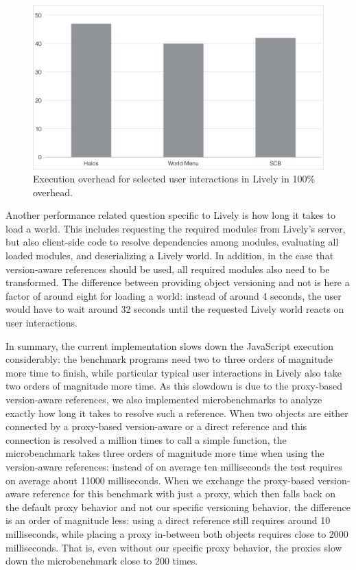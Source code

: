 \begin{figure}[h]
    \centering
    \includegraphics[width=\textwidth]{figures/livelyInteractionsOverhead.pdf}
    \caption{Execution overhead for selected user interactions in Lively in 100\% overhead.}
    \label{fig:LivelyInteractionsOverhead}
\end{figure}

Another performance related question specific to Lively is how long it takes to load a world.
This includes requesting the required modules from Lively's server, but also client-side code to resolve dependencies among modules, evaluating all loaded modules, and deserializing a Lively world.
In addition, in the case that version-aware references should be used, all required modules also need to be transformed.
The difference between providing object versioning and not is here a factor of around eight for loading a world: instead of around 4 seconds, the user would have to wait around 32 seconds until the requested Lively world reacts on user interactions.

In summary, the current implementation slows down the JavaScript execution considerably: the benchmark programs need two to three orders of magnitude more time to finish, while particular typical user interactions in Lively also take two orders of magnitude more time.
As this slowdown is due to the proxy-based version-aware references, we also implemented microbenchmarks to analyze exactly how long it takes to resolve such a reference.
When two objects are either connected by a proxy-based version-aware or a direct reference and this connection is resolved a million times to call a simple function, the microbenchmark takes three orders of magnitude more time when using the version-aware references: instead of on average ten milliseconds the test requires on average about 11000 milliseconds.
When we exchange the proxy-based version-aware reference for this benchmark with just a proxy, which then falls back on the default proxy behavior and not our specific versioning behavior, the difference is an order of magnitude less: using a direct reference still requires around 10 milliseconds, while placing a proxy in-between both objects requires close to 2000 milliseconds.
That is, even without our specific proxy behavior, the proxies slow down the microbenchmark close to 200 times.

